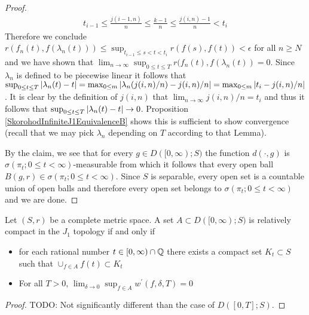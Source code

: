 \begin{proof}
\begin{align*}
t_{i-1} \leq \frac{j(i-1,n)}{n} \leq \frac{k-1}{n} \leq  \frac{j(i,n)-1}{n} < t_i
\end{align*} 
Therefore we conclude $r(f_n(t), f(\lambda_n(t))) \leq \sup_{t_{i-1} \leq s < t < t_i} r(f(s), f(t)) < \epsilon$ for all $n \geq N$ and we have shown that $\lim_{n \to \infty} \sup_{0 \leq t \leq T} r(f_n(t), f(\lambda_n(t)) = 0$.
Since $\lambda_n$ is defined to be piecewise linear it follows that $\sup_{0 \leq t \leq T} \left \vert \lambda_n(t) - t \right \vert = \max_{0 \leq m} \left \vert \lambda_n(j(i,n)/n) - j(i,n)/n \right \vert= \max_{0 \leq m} \left \vert t_i - j(i,n)/n \right \vert$.  It is clear by the definition of $j(i,n)$ that $\lim_{n\to \infty} j(i,n)/n = t_i$ and thus it follows that $\sup_{0 \leq t \leq T} \left \vert \lambda_n(t) - t \right \vert \to 0$.  Proposition \ref{SkorohodInfiniteJ1EquivalenceB} shows this is sufficient to show convergence (recall that we may pick $\lambda_n$ depending on $T$ according to that Lemma).

By the claim, we see that for every $g \in D([0,\infty); S)$ the function $d(\cdot, g)$ is $\sigma(\pi_t ; 0 \leq t < \infty)$-measurable from which it follows that every open
ball $B(g, r) \in \sigma(\pi_t ; 0 \leq t < \infty)$.  Since $S$ is separable, every open set is a countable union of open balls and therefore every open set belongs to $\sigma(\pi_t ; 0 \leq t < \infty)$ and we are done.
\end{proof}

\begin{thm}\label{SkorohodInfiniteArzelaAscoliTheoremJ1Topology}Let $(S,r)$ be a complete metric space.  A set $A \subset D([0,\infty); S)$ is relatively compact in the $J_1$ topology if and only if 
\begin{itemize}
\item[(i)]for each rational number
$t \in [0,\infty) \cap \mathbb{Q}$ there exists a compact set $K_t \subset S$ such that $\cup_{f \in A} f(t) \subset K_t$
\item[(ii)] For all $T>0$, $\lim_{\delta \to 0} \sup_{f \in A} w^\prime(f, \delta, T) = 0$
\end{itemize}
\end{thm}
\begin{proof}
TODO: Not significantly different than the case of $D([0,T];S)$.
\end{proof}

